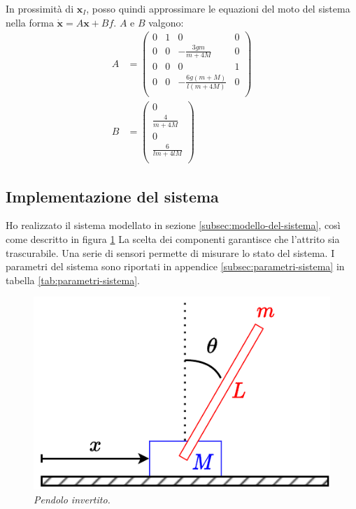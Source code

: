 In prossimità di $\mathbf x_I$, posso quindi approssimare le equazioni del moto del sistema nella forma
$\dot {\mathbf x} = A\mathbf x + B f$. $A$ e $B$ valgono:
\begin{equation}
  \begin{aligned}
    A &=
    \left(\begin{array}{cccc}0&1&0&0\\0&0&-\frac{3gm}{m+4M}&0\\0&0&0&1\\0&0&-\frac{6g(m+M)}{l(m+4M)}&0\\\end{array}\right)
    \\
    B &=
    \left(\begin{array}{c}0\\\frac{4}{m+4M}\\0\\\frac{6}{lm+4lM}\\\end{array}\right)
    \label{eq:A-e-B}
    \end{aligned}
\end{equation}

\subsection{Implementazione del sistema}\label{subsec:implementazione-del-sistema}
Ho realizzato il sistema modellato in sezione \ref{subsec:modello-del-sistema}, così come descritto in figura \ref{fig:foto}
La scelta dei componenti garantisce che l'attrito sia trascurabile.
Una serie di sensori permette di misurare lo stato del sistema.
I parametri del sistema sono riportati in appendice \ref{subsec:parametri-sistema} in tabella \ref{tab:parametri-sistema}.

\begin{figure}[h]
  \includegraphics{../assets/sistema.pdf} %
  \caption{\emph{Pendolo invertito.}}
  \label{fig:foto}
\end{figure}
